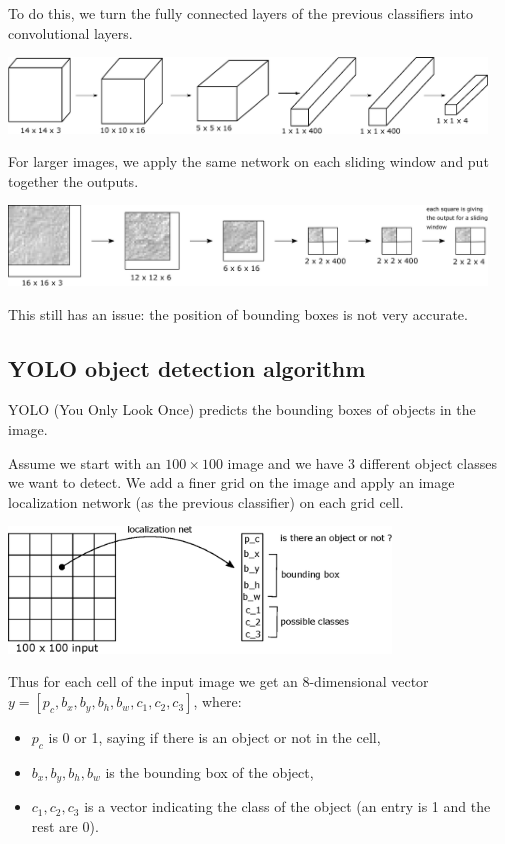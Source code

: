 \documentclass[a4paper,11pt]{report}
\begin{document}
To do this, we turn the fully connected layers of the previous classifiers into convolutional layers.

\begin{center}
\includegraphics[width = 5in]{convolutions/slide_class}
\end{center}

For larger images, we apply the same network on each sliding window and put together the outputs.

\begin{center}
\includegraphics[width = 5in]{convolutions/slides}
\end{center}

This still has an issue: the position of bounding boxes is not very accurate.

\subsection*{YOLO object detection algorithm}

YOLO (You Only Look Once) predicts the bounding boxes of objects in the image.

Assume we start with an $100\times 100$ image and we have 3 different object classes we want to detect. We add a finer grid on the image and apply an image localization network (as the previous classifier) on each grid cell.

\begin{center}
\includegraphics[width = 4in]{convolutions/yolo_grid}
\end{center}

Thus for each cell of the input image we get an 8-dimensional vector $y = [p_c, b_x, b_y, b_h, b_w, c_1, c_2, c_3]$, where:
\begin{itemize}
  \item $p_c$ is 0 or 1, saying if there is an object or not in the cell,
  \item $ b_x, b_y, b_h, b_w$ is the bounding box of the object,
  \item $c_1, c_2, c_3$ is a vector indicating the class of the object (an entry is 1 and the rest are 0).
\end{itemize}
\end{document}
